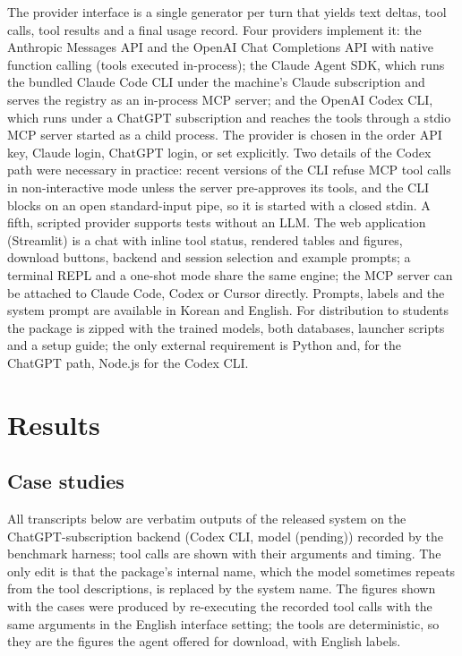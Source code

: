 \documentclass[preprint,12pt]{elsarticle}
\providecommand{\nbenchCxModel}{(pending)}
\begin{document}
The provider interface is a single generator per turn that yields text deltas, tool calls, tool results and a final usage record. Four providers implement it: the Anthropic Messages API and the OpenAI Chat Completions API with native function calling (tools executed in-process); the Claude Agent SDK, which runs the bundled Claude Code CLI under the machine's Claude subscription and serves the registry as an in-process MCP server; and the OpenAI Codex CLI, which runs under a ChatGPT subscription and reaches the tools through a stdio MCP server started as a child process. The provider is chosen in the order API key, Claude login, ChatGPT login, or set explicitly. Two details of the Codex path were necessary in practice: recent versions of the CLI refuse MCP tool calls in non-interactive mode unless the server pre-approves its tools, and the CLI blocks on an open standard-input pipe, so it is started with a closed stdin. A fifth, scripted provider supports tests without an LLM. The web application (Streamlit) is a chat with inline tool status, rendered tables and figures, download buttons, backend and session selection and example prompts; a terminal REPL and a one-shot mode share the same engine; the MCP server can be attached to Claude Code, Codex or Cursor directly. Prompts, labels and the system prompt are available in Korean and English. For distribution to students the package is zipped with the trained models, both databases, launcher scripts and a setup guide; the only external requirement is Python and, for the ChatGPT path, Node.js for the Codex CLI.

\section{Results}\label{sec:results}

\subsection{Case studies}\label{sec:cases}

All transcripts below are verbatim outputs of the released system on the ChatGPT-subscription backend (Codex CLI, model \nbenchCxModel) recorded by the benchmark harness; tool calls are shown with their arguments and timing. The only edit is that the package's internal name, which the model sometimes repeats from the tool descriptions, is replaced by the system name. The figures shown with the cases were produced by re-executing the recorded tool calls with the same arguments in the English interface setting; the tools are deterministic, so they are the figures the agent offered for download, with English labels.
\end{document}
